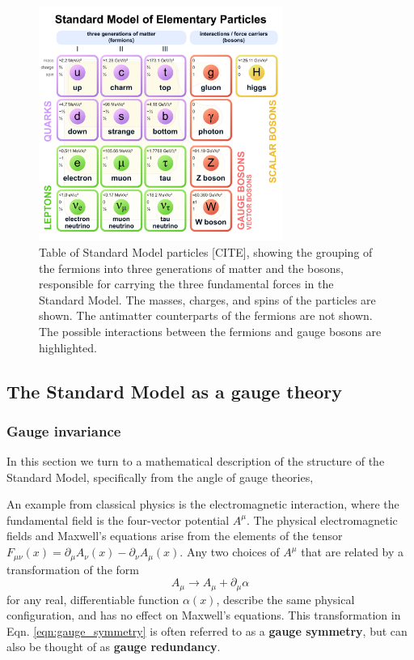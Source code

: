 \documentclass{article}
\begin{document}
\begin{figure}[ht]
    \centering
    \includegraphics[width=8cm]{figures/Standard_Model_of_Elementary_Particles.pdf}
    \caption{Table of Standard Model particles [CITE], showing the grouping of the fermions into three generations of matter and the bosons, responsible for carrying the three fundamental forces in the Standard Model. The masses, charges, and spins of the particles are shown. The antimatter counterparts of the fermions are not shown. The possible interactions between the fermions and gauge bosons are highlighted.}
    \label{fig:intro-standard-model}
\end{figure}





\subsection{The Standard Model as a gauge theory}

\subsubsection{Gauge invariance}

In this section we turn to a mathematical description of the structure of the Standard Model, specifically from the angle of gauge theories,

An example from classical physics is the electromagnetic interaction, where the fundamental field is the four-vector potential $A^\mu$. The physical electromagnetic fields and Maxwell's equations arise from the elements of the tensor $F_{\mu\nu}(x) = \partial_\mu A_\nu (x) - \partial_\nu A_\mu (x)$. Any two choices of $A^\mu$ that are related by a transformation of the form \begin{equation} A_\mu \rightarrow A_\mu + \partial_\mu \alpha \label{eqn:gauge_symmetry}\end{equation} for any real, differentiable function $\alpha(x)$, describe the same physical configuration, and has no effect on Maxwell's equations. This transformation in Eqn. \ref{eqn:gauge_symmetry} is often referred to as a \textbf{gauge symmetry}, but can also be thought of as \textbf{gauge redundancy}.
\end{document}
